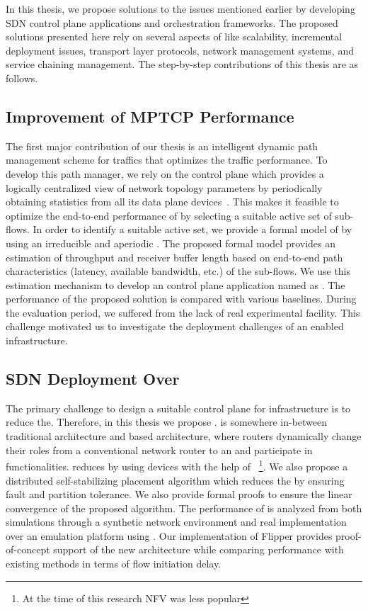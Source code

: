 In this thesis, we propose solutions to the issues mentioned earlier by developing SDN control plane applications and orchestration frameworks. The proposed solutions presented here rely on several aspects of  like scalability, incremental deployment issues, transport layer protocols, network management systems, and service chaining management. The step-by-step contributions of this thesis are as follows.
\subsection{Improvement of MPTCP Performance}
The first major contribution of our thesis is an intelligent dynamic path management scheme for  traffics that optimizes the traffic performance. To develop this path manager, we rely on the  control plane which provides a logically centralized view of network topology parameters by periodically obtaining statistics from all its data plane devices~\cite{nunes2014survey}. This makes it feasible to optimize the end-to-end performance of  by selecting a suitable active set of  sub-flows. In order to identify a suitable active set, we provide a formal model of  by using an irreducible and aperiodic . The proposed formal model provides an estimation of  throughput and receiver buffer length based on end-to-end path characteristics (latency, available bandwidth, etc.) of the sub-flows. We use this estimation mechanism to develop an  control plane application named as . The performance of the proposed solution is compared with various baselines. During the evaluation period, we suffered from the lack of real  experimental facility. This challenge motivated us to investigate the deployment challenges of an  enabled  infrastructure.
\subsection{SDN Deployment Over }
The primary challenge to design a suitable  control plane for  infrastructure is to reduce the. Therefore, in this thesis we propose .  is somewhere in-between traditional architecture and  based architecture, where  routers dynamically change their roles from a conventional network router to an  and participate in  functionalities.  reduces  by using  devices with the help of ~\cite{koponen2010odc}\footnote{At the time of this research NFV was less popular}. We also propose a distributed self-stabilizing  placement algorithm which reduces the  by ensuring fault and partition tolerance. We also provide formal proofs to ensure the linear convergence of the proposed algorithm. The performance of  is analyzed from both simulations through a synthetic network environment and real implementation over an emulation platform using . Our implementation of Flipper provides proof-of-concept support of the new architecture while comparing performance with existing methods in terms of flow initiation delay.
